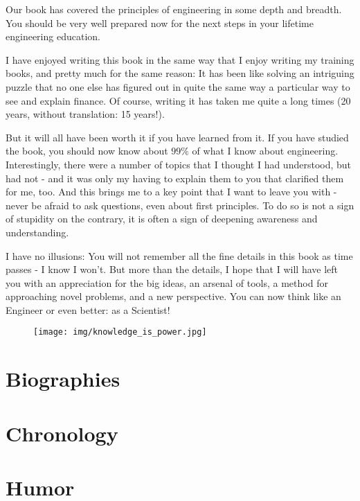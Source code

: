 \documentclass[12pt,a4paper,twoside,openright]{report}
\theoremstyle{definition}
\theoremstyle{itexmp}
\numberwithin{equation}{section}
\begin{document}
	Our book has covered the principles of engineering in some depth and breadth. You should be very well prepared now for the next steps in your lifetime engineering education.
	
	I have enjoyed writing this book in the same way that I enjoy writing my training books, and pretty much for the same reason: It has been like solving an intriguing puzzle that no one else has figured out in quite the same way a particular way to see and explain finance. Of course, writing it has taken me quite a long times (20 years, without translation: 15 years!).
	
	But it will all have been worth it if you have learned from it. If you have studied the book, you should now know about $99\%$ of what I know about engineering. Interestingly, there were a number of topics that I thought I had understood, but had not - and it was only my having to explain them to you that clarified them for me, too. And this brings me to a key point that I want to leave you with - never be afraid to ask questions, even about first principles. To do so is not a sign of stupidity on the contrary, it is often a sign of deepening awareness and understanding.

	I have no illusions: You will not remember all the fine details in this book as time passes - I know I won't. But more than the details, I hope that I will have left you with an appreciation for the big ideas, an arsenal of tools, a method for approaching novel problems, and a new perspective. You can now think like an Engineer or even better: as a Scientist! 
	\begin{figure}[H]
		\centering
		\texttt{[image: img/knowledge\_is\_power.jpg]}	
	\end{figure}
	
	\chapter{Biographies}
	

	\chapter{Chronology}\label{chronology}
	

	\chapter{Humor}
	\minitoc
	\pagebreak
	
\end{document}
